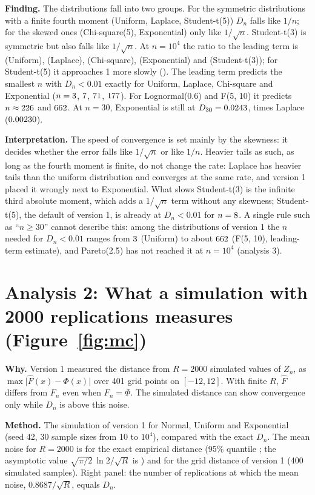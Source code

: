 \documentclass[11pt,a4paper]{article}
\begin{document}
\textbf{Finding.} The distributions fall into two groups. For the symmetric distributions with a finite fourth moment (Uniform,
Laplace, Student-t(5)) $D_n$ falls like $1/n$; for the skewed ones (Chi-square(5), Exponential) only like $1/\sqrt n$. Student-t(3)
is symmetric but also falls like $1/\sqrt n$. At $n = 10^4$ the ratio to the leading term is \UniRatio{} (Uniform), \LapRatio{}
(Laplace), \ChiRatio{} (Chi-square), \ExpRatio{} (Exponential) and \TThreeRatio{} (Student-t(3)); for Student-t(5) it approaches 1
more slowly (\TFiveRatio{}). The leading term predicts the smallest $n$ with $D_n < 0.01$ exactly for Uniform, Laplace,
Chi-square and Exponential ($n = 3$, $7$, $71$, $177$). For Lognormal(0.6) and F(5, 10) it predicts
$n \approx 226$ and $662$. At $n = 30$, Exponential is still at $D_{30} = 0.0243$, \ExpOverLap{} times Laplace
($0.00230$).

\textbf{Interpretation.} The speed of convergence is set mainly by the skewness: it decides whether the error falls like $1/\sqrt n$ or
like $1/n$. Heavier tails as such, as long as the fourth moment is finite, do not change the rate: Laplace has heavier tails than the uniform
distribution and converges at the same rate, and version 1 placed it wrongly next to Exponential. What slows Student-t(3) is the infinite third absolute moment, which adds
a $1/\sqrt n$ term without any skewness; Student-t(5), the default of version 1, is already at $D_n < 0.01$ for $n = 8$.
A single rule such as ``$n \ge 30$'' cannot describe this: among the distributions of version 1 the $n$ needed for $D_n < 0.01$
ranges from $3$ (Uniform) to about $662$ (F(5, 10), leading-term estimate), and Pareto(2.5) has not reached it at
$n = 10^4$ (analysis 3).

\section{Analysis 2: What a simulation with 2000 replications measures (Figure~\ref{fig:mc})}

\textbf{Why.} Version 1 measured the distance from $R = 2000$ simulated values of $Z_n$, as $\max\lvert\hat F(x) - \Phi(x)\rvert$
over 401 grid points on $[-12, 12]$. With finite $R$, $\hat F$ differs from $F_n$ even when $F_n = \Phi$. The simulated distance can
show convergence only while $D_n$ is above this noise.

\textbf{Method.} The simulation of version 1 for Normal, Uniform and Exponential (seed 42, 30 sample sizes from 10 to $10^4$),
compared with the exact $D_n$. The mean noise for $R = 2000$ is \NoiseExact{} for the exact empirical distance
(95\% quantile \NoiseQ{}; the asymptotic value $\sqrt{\pi/2}\,\ln 2/\sqrt R$ is \NoiseAsym{}) and \NoiseGrid{} for the grid distance of
version 1 (400 simulated samples). Right panel: the number of replications at which the mean noise, $0.8687/\sqrt R$, equals $D_n$.
\end{document}
